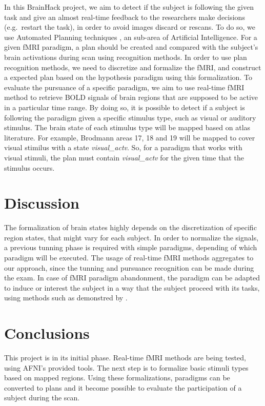 \documentclass[twocolumn]{bmcart}%
\begin{document}
In this BrainHack project, we aim to detect if the subject is following
the given task and give an almost real-time feedback to the researchers
make decisions (e.g.~restart the task), in order to avoid images discard
or rescans. To do so, we use Automated Planning techniques
\cite{Sukthankar2014}, an sub-area of Artificial Intelligence. For a
given fMRI paradigm, a plan should be created and compared with the
subject's brain activations during scan using recognition methods. In
order to use plan recognition methods, we need to discretize and
formalize the fMRI, and construct a expected plan based on the
hypothesis paradigm using this formalization. To evaluate the pursuance
of a specific paradigm, we aim to use real-time fMRI method to retrieve
BOLD signals of brain regions that are supposed to be active in a
particular time range. By doing so, it is possible to detect if a
subject is following the paradigm given a specific stimulus type, such
as visual or auditory stimulus. The brain state of each stimulus type
will be mapped based on atlas literature. For example, Brodmann areas
17, 18 and 19 will be mapped to cover visual stimilus with a state
\emph{visual\_actv}. So, for a paradigm that works with visual stimuli,
the plan must contain \emph{visual\_actv} for the given time that the
stimulus occurs.

\section{Discussion}\label{discussion}

The formalization of brain states highly depends on the discretization
of specific region states, that might vary for each subject. In order to
normalize the signals, a previous tunning phase is required with simple
paradigms, depending of which paradigm will be executed. The usage of
real-time fMRI methods aggregates to our approach, since the tunning and
pursuance recognition can be made during the exam. In case of fMRI
paradigm abandonment, the paradigm can be adapted to induce or interest
the subject in a way that the subject proceed with its tasks, using
methods such as demonstred by \cite{Dongha2011}.

\section{Conclusions}\label{conclusions}

This project is in its initial phase. Real-time fMRI methods are being
tested, using AFNI's provided tools. The next step is to formalize basic
stimuli types based on mapped regions. Using these formalizations,
paradigms can be converted to plans and it become possible to evaluate
the participation of a subject during the scan.
\end{document}
